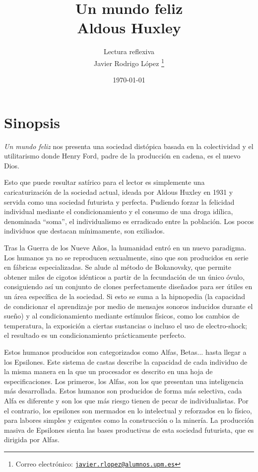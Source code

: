 \documentclass{article}
\title{\Huge Un mundo feliz\\\vspace*{5pt}
\Large Aldous Huxley}
\author{Lectura reflexiva\\\vspace*{5pt}Javier Rodrigo López \thanks{Correo electrónico: \href{mailto:javier.rlopez@alumnos.upm.es}{\texttt{javier.rlopez@alumnos.upm.es}}}}
\date{\today}
\begin{document}
\maketitle
\tableofcontents
\newpage

\section{Sinopsis}

\textit{Un mundo feliz} nos presenta una sociedad distópica basada en la colectividad y el utilitarismo donde Henry Ford, padre de la producción en cadena, es el nuevo Dios.

Esto que puede resultar satírico para el lector es simplemente una caricaturización de la sociedad actual, ideada por Aldous Huxley en 1931 y servida como una sociedad futurista y perfecta. Pudiendo forzar la felicidad individual mediante el condicionamiento y el consumo de una droga idílica, denominada ``soma'', el individualismo es erradicado entre la población. Los pocos individuos que destacan mínimamente, son exiliados.

Tras la Guerra de los Nueve Años, la humanidad entró en un nuevo paradigma. Los humanos ya no se reproducen sexualmente, sino que son producidos en serie en fábricas especializadas. Se alude al método de Bokanovsky, que permite obtener miles de cigotos idénticos a partir de la fecundación de un único óvulo, consiguiendo así un conjunto de clones perfectamente diseñados para ser útiles en un área específica de la sociedad. Si esto se suma a la hipnopedia (la capacidad de condicionar el aprendizaje por medio de mensajes sonoros inducidos durante el sueño) y al condicionamiento mediante estímulos físicos, como los cambios de temperatura, la exposición a ciertas sustancias o incluso el uso de electro-shock; el resultado es un condicionamiento prácticamente perfecto.

Estos humanos producidos son categorizados como Alfas, Betas... hasta llegar a los Epsilones. Este sistema de castas describe la capacidad de cada individuo de la misma manera en la que un procesador es descrito en una hoja de especificaciones. Los primeros, los Alfas, son los que presentan una inteligencia más desarrollada. Estos humanos son producidos de forma más selectiva, cada Alfa es diferente y son los que más riesgo tienen de pecar de individualistas. Por el contrario, los epsilones son mermados en lo intelectual y reforzados en lo físico, para labores simples y exigentes como la construcción o la minería. La producción masiva de Epsilones sienta las bases productivas de esta sociedad futurista, que es dirigida por Alfas.
\end{document}
